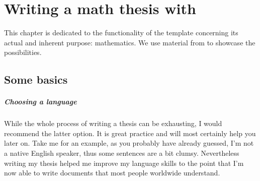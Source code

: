 \chapter{Writing a math thesis with \texttt{\classname}}\label{ch:math}
This chapter is dedicated to the functionality of the template concerning its actual and 
inherent purpose: mathematics. We use material from \cite{FineProp2015} to showcase 
the possibilities.
\section{Some basics}
\paragraph{Choosing a language}
While the whole process 
of writing a thesis can be exhausting, I would recommend the latter option. It is great 
practice and will most certainly help you later on. Take me for an example, as you 
probably have already guessed, I'm not a native English speaker, thus some sentences 
are a bit clumsy. Nevertheless writing my thesis helped me improve my language skills 
to the point that I'm now able to write documents that most people worldwide understand.
